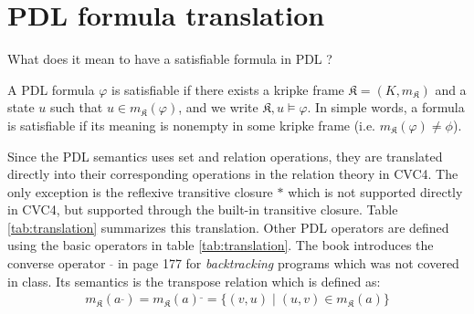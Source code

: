 \documentclass[12pt,a4paper]{article}
\begin{document}
\section{PDL formula translation}

What does it mean to have a satisfiable formula in PDL ?

A PDL formula $\varphi$ is satisfiable if there exists a kripke frame $\mathfrak{K}=(K, m_{\mathfrak{K}})$ and a state  $u$ such that $u \in m_{\mathfrak{K}}(\varphi) $, and we write $\mathfrak{K}, u \models \varphi$. In simple words, a formula is satisfiable if its meaning is nonempty in some kripke frame (i.e. $m_{\mathfrak{K}}(\varphi) \neq \phi$). 

Since the PDL semantics uses set and relation operations, they are translated directly into their corresponding operations in the relation theory in CVC4. The only exception is the reflexive transitive closure $*$ which is not supported directly in CVC4, but supported through the built-in transitive closure. Table \ref{tab:translation} summarizes this translation. Other PDL operators are defined using the basic operators in table \ref{tab:translation}. The book \cite{dynamic} introduces the converse operator $^{\_}$ in page 177 for \textit{backtracking} programs which was not covered in class. Its semantics is the transpose relation which is defined as:
\begin{align*}
m_{\mathfrak{K}}(a^{\_}) = m_{\mathfrak{K}}(a)^{\_} = \lbrace (v, u) \; \vert \; (u, v) \in m_{\mathfrak{K}}(a) \rbrace
\end{align*}
\end{document}
